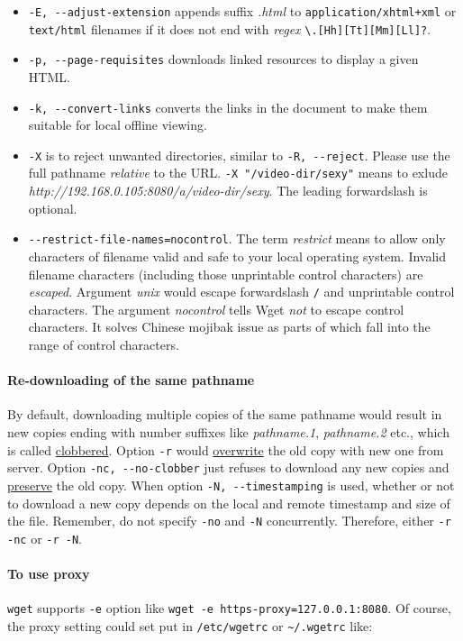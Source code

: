 \begin{itemize}
\item \lstinline|-E, --adjust-extension| appends suffix
  \textit{.html} to \verb|application/xhtml+xml| or
  \verb|text/html| filenames if it does not end with
  \textit{regex} \lstinline|\.[Hh][Tt][Mm][Ll]?|.
\item \lstinline|-p, --page-requisites| downloads linked resources
  to display a given HTML.
\item \lstinline|-k, --convert-links| converts the links in the
  document to make them suitable for local offline viewing.
\item \lstinline|-X| is to reject unwanted directories, similar to
  \lstinline|-R, --reject|. Please use the full pathname
  \textit{relative} to the URL. \lstinline|-X "/video-dir/sexy"|
  means to exlude
  \textit{http://192.168.0.105:8080/a/video-dir/sexy}. The
  leading forwardslash is optional.
\item \lstinline|--restrict-file-names=nocontrol|. The term
  \textit{restrict} means to allow only characters of filename
  valid and safe to your local operating system. Invalid filename
  characters (including those unprintable control characters) are
  \textit{escaped}. Argument \textit{unix} would escape
  forwardslash \lstinline|/| and unprintable control
  characters. The argument \textit{nocontrol} tells Wget
  \textit{not} to escape control characters. It solves Chinese
  mojibak issue as parts of which fall into the range of control
  characters.
\end{itemize}

\paragraph{Re-downloading of the same pathname} By default,
downloading multiple copies of the same pathname would result in
new copies ending with number suffixes like \textit{pathname.1},
\textit{pathname.2} etc., which is called
\uline{clobbered}. Option \verb|-r| would \uline{overwrite} the
old copy with new one from server. Option \verb|-nc, --no-clobber|
just refuses to download any new copies and \uline{preserve} the
old copy. When option \verb|-N, --timestamping| is used, whether or
not to download a new copy depends on the local and remote
timestamp and size of the file. Remember, do not specify
\verb|-no| and \verb|-N| concurrently. Therefore, either
\verb|-r -nc| or \verb|-r -N|.

\paragraph{To use proxy} \lstinline|wget| supports \lstinline|-e|
option like \lstinline|wget -e https-proxy=127.0.0.1:8080|. Of
course, the proxy setting could set put in \lstinline|/etc/wgetrc|
or \lstinline|~/.wgetrc| like:

